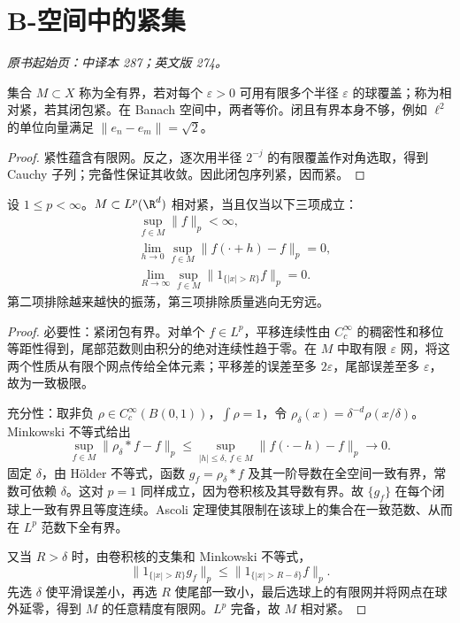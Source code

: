 \section{B-空间中的紧集}\label{sec:yosida-10-01}
\noindent\textit{原书起始页：中译本 287；英文版 274。}

\begin{definition}[全有界与相对紧]
集合 $M\subset X$ 称为全有界，若对每个 $\varepsilon>0$ 可用有限多个半径 $\varepsilon$ 的球覆盖；称为相对紧，若其闭包紧。在 Banach 空间中，两者等价。闭且有界本身不够，例如 $\ell^2$ 的单位向量满足 $\|e_n-e_m\|=\sqrt2$。
\end{definition}
\begin{proof}
紧性蕴含有限网。反之，逐次用半径 $2^{-j}$ 的有限覆盖作对角选取，得到 Cauchy 子列；完备性保证其收敛。因此闭包序列紧，因而紧。
\end{proof}

\begin{theorem}\label{thm:y10-kolmogorov}
设 $1\le p<\infty$。$M\subset L^p(\R^d)$ 相对紧，当且仅当以下三项成立：
\begin{align*}
 &\sup_{f\in M}\|f\|_p<\infty,\\
 &\lim_{h\to0}\sup_{f\in M}\|f(\cdot+h)-f\|_p=0,\\
 &\lim_{R\to\infty}\sup_{f\in M}\|1_{\{|x|>R\}}f\|_p=0.
\end{align*}
第二项排除越来越快的振荡，第三项排除质量逃向无穷远。
\end{theorem}
\begin{proof}
必要性：紧闭包有界。对单个 $f\in L^p$，平移连续性由 $C_c^\infty$ 的稠密性和移位等距性得到，尾部范数则由积分的绝对连续性趋于零。在 $M$ 中取有限 $\varepsilon$ 网，将这两个性质从有限个网点传给全体元素；平移差的误差至多 $2\varepsilon$，尾部误差至多 $\varepsilon$，故为一致极限。

充分性：取非负 $\rho\in C_c^\infty(B(0,1))$，$\int\rho=1$，令 $\rho_\delta(x)=\delta^{-d}\rho(x/\delta)$。Minkowski 不等式给出
\[
 \sup_{f\in M}\|\rho_\delta*f-f\|_p
 \le\sup_{|h|\le\delta,\,f\in M}\|f(\cdot-h)-f\|_p\longrightarrow0.
\]
固定 $\delta$，由 Hölder 不等式，函数 $g_f=\rho_\delta*f$ 及其一阶导数在全空间一致有界，常数可依赖 $\delta$。这对 $p=1$ 同样成立，因为卷积核及其导数有界。故 $\{g_f\}$ 在每个闭球上一致有界且等度连续。Ascoli 定理使其限制在该球上的集合在一致范数、从而在 $L^p$ 范数下全有界。

又当 $R>\delta$ 时，由卷积核的支集和 Minkowski 不等式，
\[
 \|1_{\{|x|>R\}}g_f\|_p
 \le\|1_{\{|x|>R-\delta\}}f\|_p.
\]
先选 $\delta$ 使平滑误差小，再选 $R$ 使尾部一致小，最后选球上的有限网并将网点在球外延零，得到 $M$ 的任意精度有限网。$L^p$ 完备，故 $M$ 相对紧。
\end{proof}


